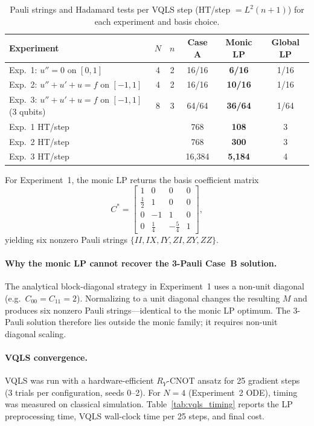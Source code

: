 \documentclass[a4paper,12pt]{amsart}
\begin{document}
\begin{table}[h]
\centering
\caption{Pauli strings and Hadamard tests per VQLS step (HT/step $= L^2(n+1)$) for each experiment and basis choice.}
\label{tab:monic}
\begin{tabular}{lccccc}
\hline
Experiment & $N$ & $n$ & Case A & Monic LP & Global LP \\
\hline
Exp.~1: $u''=0$ on $[0,1]$                    & 4 & 2 & 16/16 & \textbf{6/16}  & 1/16 \\
Exp.~2: $u''+u'+u=f$ on $[-1,1]$              & 4 & 2 & 16/16 & \textbf{10/16} & 1/16 \\
Exp.~3: $u''+u'+u=f$ on $[-1,1]$ (3 qubits)  & 8 & 3 & 64/64 & \textbf{36/64} & 1/64 \\
\hline
Exp.~1 HT/step & & & 768 & \textbf{108} & 3 \\
Exp.~2 HT/step & & & 768 & \textbf{300} & 3 \\
Exp.~3 HT/step & & & 16{,}384 & \textbf{5{,}184} & 4 \\
\hline
\end{tabular}
\end{table}

For Experiment~1, the monic LP returns the basis coefficient matrix
\begin{equation}
C^* =
\begin{bmatrix}
1 & 0 & 0 & 0 \\
\tfrac{1}{2} & 1 & 0 & 0 \\
0 & -1 & 1 & 0 \\
0 & \tfrac{1}{4} & -\tfrac{5}{4} & 1
\end{bmatrix},
\end{equation}
yielding six nonzero Pauli strings $\{II, IX, IY, ZI, ZY, ZZ\}$.

\paragraph{Why the monic LP cannot recover the 3-Pauli Case~B solution.}
The analytical block-diagonal strategy in Experiment~1 uses a non-unit diagonal (e.g.\ $C_{00}=C_{11}=2$). Normalizing to a unit diagonal changes the resulting $M$ and produces six nonzero Pauli strings---identical to the monic LP optimum. The 3-Pauli solution therefore lies outside the monic family; it requires non-unit diagonal scaling.

\paragraph{VQLS convergence.}
VQLS was run with a hardware-efficient $R_Y$-CNOT ansatz for 25 gradient steps (3 trials per configuration, seeds 0--2). For $N=4$ (Experiment~2 ODE), timing was measured on classical simulation. Table~\ref{tab:vqls_timing} reports the LP preprocessing time, VQLS wall-clock time per 25 steps, and final cost.
\end{document}
